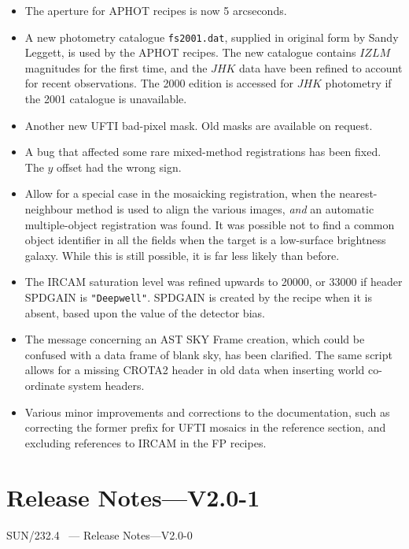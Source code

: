 \documentclass[twoside,11pt]{article}
\newcommand{\stardocinitials}  {SUN}
\newcommand{\stardocnumber}    {232.4}
\newcommand{\stardocname}{\stardocinitials /\stardocnumber}
\newcommand{\xlabel}[1]{}
\renewcommand{\_}{\texttt{\symbol{95}}}
\begin{document}
\begin{itemize}
   \item The aperture for \_APHOT recipes is now 5 arcseconds.
   \item A new photometry catalogue {\tt fs2001.dat}, supplied in
      original form by Sandy Leggett, is used by the \_APHOT recipes.
      The new catalogue contains $IZLM$ magnitudes for the first time,
      and the $JHK$ data have been refined to account for recent
      observations.  The 2000 edition is accessed for $JHK$ photometry
      if the 2001 catalogue is unavailable. 
   \item Another new UFTI bad-pixel mask.  Old masks are available on
      request.
   \item A bug that affected some rare mixed-method registrations has
      been fixed.  The $y$ offset had the wrong sign.
   \item Allow for a special case in the mosaicking registration, when
      the nearest-neighbour method is used to align the various images,
      {\em{and}} an automatic multiple-object registration was found.
      It was possible not to find a common object identifier in all
      the fields when the target is a low-surface brightness galaxy.
      While this is still possible, it is far less likely than before.
   \item The IRCAM saturation level was refined upwards to 20000, or
      33000 if header SPD\_GAIN is {\tt{"Deepwell"}}.  SPD\_GAIN
      is created by the recipe when it is absent, based upon the value
      of the detector bias.
   \item The message concerning an AST SKY Frame creation,
      which could be confused with a data frame of blank sky, has been
      clarified.  The same script allows for a missing CROTA2 header
      in old data when inserting world co-ordinate system headers.
   \item Various minor improvements and corrections to the
      documentation, such as correcting the former prefix for UFTI
      mosaics in the reference section, and excluding references to
      IRCAM in the FP recipes.
\end{itemize}


\section{\xlabel{se_changes2p0}Release Notes---V2.0-1\label{se_changes2p0}}
\markboth{{\stardocname}~ --- Release Notes---V2.0-0}
{{\stardocname}~ --- Release Notes---V2.0-0}
\end{document}
